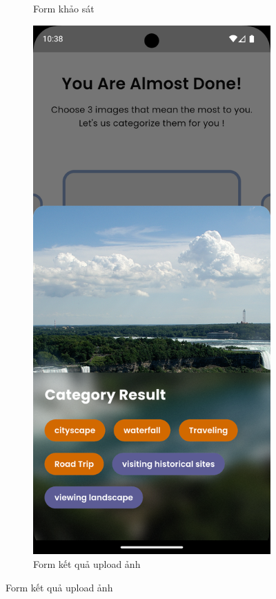 \begin{figure}[H]
\begin{subfigure}{0.32\textwidth}
        \caption{Form khảo sát}
        \label{fig:upload-form}
    \end{subfigure}
    \hfill
    \begin{subfigure}{0.32\textwidth}
        \includegraphics[width=1\linewidth]{figures/c4/4-2/basic_info_4.png} 
        \caption{Form kết quả upload ảnh}
        \label{fig:survey-form}
    \end{subfigure}
    \label{fig:basic-information-screen}
\end{figure}

